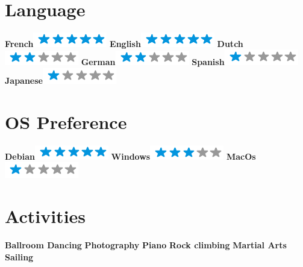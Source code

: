 \begin{aside}
  ~
  \makecvsideheader%
  \section{Language}
    \textbf{French}\includegraphics[scale=0.40]{img/5stars.png}
    \textbf{English}\includegraphics[scale=0.40]{img/5stars.png}
    \textbf{Dutch}\includegraphics[scale=0.40]{img/2stars.png}
    \textbf{German}\includegraphics[scale=0.40]{img/2stars.png}
    \textbf{Spanish}\includegraphics[scale=0.40]{img/1stars.png}
    \textbf{Japanese}\includegraphics[scale=0.40]{img/1stars.png}
  ~
  \section{OS Preference}
    \textbf{Debian}\includegraphics[scale=0.40]{img/5stars.png}
    \textbf{Windows}\includegraphics[scale=0.40]{img/3stars.png}
    \textbf{MacOs}\includegraphics[scale=0.40]{img/1stars.png}
  ~
  \section{Activities}
    \textbf{Ballroom Dancing}
    \textbf{Photography}
    \textbf{Piano}
    \textbf{Rock climbing}
    \textbf{Martial Arts}
    \textbf{Sailing}
\end{aside}
